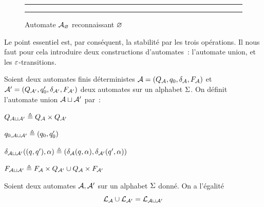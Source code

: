 \begin{figure}[t]
  \centering
  \hrule

  \vspace{0.2cm}

  \vspace{0.2cm}
  \hrule

  \vspace{0.2cm}
  \caption{Automate $\mathcal{A}_{\varnothing}$ reconnaissant $\varnothing$}
  \label{fig.auto.vide}
\end{figure}

Le point essentiel est, par conséquent, la stabilité par les trois opérations.
Il nous faut pour cela introduire deux constructions d'automates~: l'automate
union, et les $\varepsilon$-transitions.

\begin{definition}
  Soient deux automates finis déterministes
  $\mathcal{A} = (Q_{\mathcal{A}},q_{0},\delta_{\mathcal{A}},F_{\mathcal{A}})$ et
  $\mathcal{A}' = (Q_{\mathcal{A}'},q_{0}',\delta_{\mathcal{A}'},F_{\mathcal{A}'})$ deux automates sur un alphabet
  $\Sigma$. On définit l'automate union $\mathcal{A}\mathbin{\sqcup}\mathcal{A}'$ par~:
  \vspace{0.1cm}
  \begin{itemize}
    \begin{minipage}{0.45\textwidth}
    \item $Q_{\mathcal{A}\mathbin{\sqcup}\mathcal{A}'} \triangleq Q_{\mathcal{A}}\times Q_{\mathcal{A}'}$
    \item $q_{0,\mathcal{A}\mathbin{\sqcup}\mathcal{A}'} \triangleq (q_{0},q_{0}')$
    \end{minipage}
    \begin{minipage}{0.45\textwidth}
    \item
      $\delta_{\mathcal{A}\mathbin{\sqcup}\mathcal{A}'}((q_{},q_{}'),\alpha)\triangleq
      (\delta_{\mathcal{A}}(q_{},\alpha),\delta_{\mathcal{A}'}(q_{}',\alpha))$
    \item $F_{\mathcal{A}\mathbin{\sqcup}\mathcal{A}'} \triangleq F_{\mathcal{A}}\times Q_{\mathcal{A}'} \cup Q_{\mathcal{A}}\times F_{\mathcal{A}'}$
    \end{minipage}
  \end{itemize}
\end{definition}

\begin{proposition}\label{prop.union.ratio}
  Soient deux automates $\mathcal{A}, \mathcal{A}'$ sur un alphabet $\Sigma$ donné. On a
  l'égalité
  \[\mathcal L_{\mathcal{A}} \cup \mathcal L_{\mathcal{A}'} = \mathcal L_{\mathcal{A}\mathbin{\sqcup}\mathcal{A}'}\]
\end{proposition}

